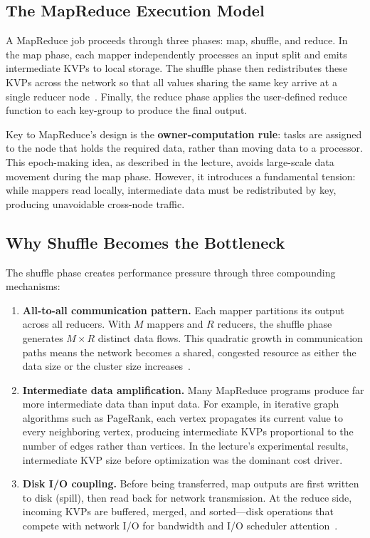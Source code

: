 \documentclass[a4paper,11pt]{article}
\begin{document}
\subsection{The MapReduce Execution Model}

A MapReduce job proceeds through three phases: map, shuffle, and reduce. In the map phase, each mapper independently processes an input split and emits intermediate KVPs to local storage. The shuffle phase then redistributes these KVPs across the network so that all values sharing the same key arrive at a single reducer node~\cite{white2015}. Finally, the reduce phase applies the user-defined reduce function to each key-group to produce the final output.

Key to MapReduce's design is the \textbf{owner-computation rule}: tasks are assigned to the node that holds the required data, rather than moving data to a processor. This epoch-making idea, as described in the lecture, avoids large-scale data movement during the map phase. However, it introduces a fundamental tension: while mappers read locally, intermediate data must be redistributed by key, producing unavoidable cross-node traffic.

\subsection{Why Shuffle Becomes the Bottleneck}

The shuffle phase creates performance pressure through three compounding mechanisms:

\begin{enumerate}[leftmargin=*]
    \item \textbf{All-to-all communication pattern.} Each mapper partitions its output across all reducers. With $M$ mappers and $R$ reducers, the shuffle phase generates $M \times R$ distinct data flows. This quadratic growth in communication paths means the network becomes a shared, congested resource as either the data size or the cluster size increases~\cite{dean2004}.

    \item \textbf{Intermediate data amplification.} Many MapReduce programs produce far more intermediate data than input data. For example, in iterative graph algorithms such as PageRank, each vertex propagates its current value to every neighboring vertex, producing intermediate KVPs proportional to the number of edges rather than vertices. In the lecture's experimental results, intermediate KVP size before optimization was the dominant cost driver.

    \item \textbf{Disk I/O coupling.} Before being transferred, map outputs are first written to disk (spill), then read back for network transmission. At the reduce side, incoming KVPs are buffered, merged, and sorted---disk operations that compete with network I/O for bandwidth and I/O scheduler attention~\cite{condie2010}.
\end{enumerate}
\end{document}

